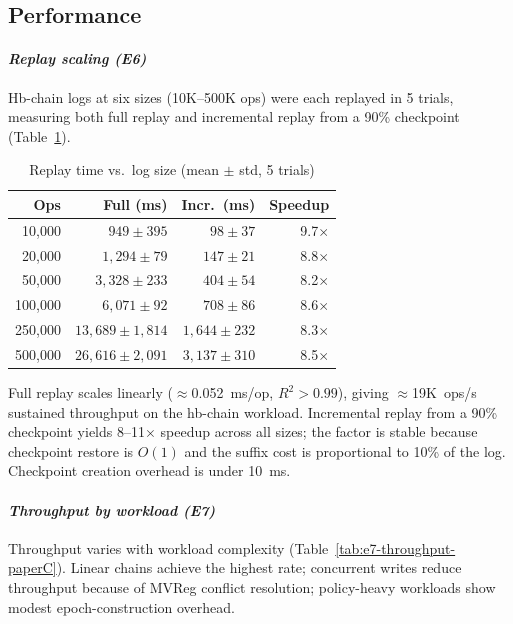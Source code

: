 \documentclass[10pt,journal,compsoc]{IEEEtran}
\begin{document}
\subsection{Performance}\label{subsec:performance-paperC}

\paragraph*{\textit{Replay scaling (E6)}}
Hb-chain logs at six sizes (10K--500K ops) were each replayed in 5 trials, measuring both full replay and incremental replay from a 90\% checkpoint (Table~\ref{tab:e6-replay-paperC}).

\begin{table}[htbp]
\centering
\caption{Replay time vs.\ log size (mean $\pm$ std, 5 trials)}
\label{tab:e6-replay-paperC}
\begin{tabular}{@{}rrrr@{}}
\toprule
\textbf{Ops} & \textbf{Full (ms)} & \textbf{Incr.\ (ms)} & \textbf{Speedup} \\
\midrule
10,000  & $949 \pm 395$   & $98 \pm 37$     & 9.7$\times$ \\
20,000  & $1{,}294 \pm 79$  & $147 \pm 21$    & 8.8$\times$ \\
50,000  & $3{,}328 \pm 233$ & $404 \pm 54$    & 8.2$\times$ \\
100,000 & $6{,}071 \pm 92$  & $708 \pm 86$    & 8.6$\times$ \\
250,000 & $13{,}689 \pm 1{,}814$ & $1{,}644 \pm 232$ & 8.3$\times$ \\
500,000 & $26{,}616 \pm 2{,}091$ & $3{,}137 \pm 310$ & 8.5$\times$ \\
\bottomrule
\end{tabular}
\end{table}

Full replay scales linearly ($\approx$0.052~ms/op, $R^2>0.99$), giving $\approx$19K~ops/s sustained throughput on the hb-chain workload. Incremental replay from a 90\% checkpoint yields 8--11$\times$ speedup across all sizes; the factor is stable because checkpoint restore is $O(1)$ and the suffix cost is proportional to 10\% of the log. Checkpoint creation overhead is under 10~ms.

\paragraph*{\textit{Throughput by workload (E7)}}
Throughput varies with workload complexity (Table~\ref{tab:e7-throughput-paperC}). Linear chains achieve the highest rate; concurrent writes reduce throughput because of MVReg conflict resolution; policy-heavy workloads show modest epoch-construction overhead.
\end{document}
